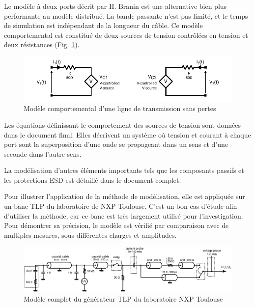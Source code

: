 Le modèle à deux ports décrit par H. Branin \cite{branin-tl-ref} est une alternative bien plus performante au modèle distribué.
La bande passante n'est pas limité, et le temps de simulation est indépendant de la longueur du câble.
Ce modèle comportemental est constitué de deux sources de tension contrôlées en tension et deux résistances (Fig. \ref{fig:beh-line-model}).

\begin{figure}[!h]
  \centering
  \includegraphics[width=\textwidth]{src/1/figures/behavioral_line_model.pdf}
  \caption{Modèle comportemental d'une ligne de transmission sans pertes}
  \label{fig:beh-line-model}
\end{figure}

Les équations définissant le comportement des sources de tension sont données dans le document final.
Elles décrivent un système où tension et courant à chaque port sont la superposition d'une onde se propageant dans un sens et d'une seconde dans l'autre sens.

La modélisation d'autres éléments importants tels que les composants passifs et les protections ESD est détaillé dans le document complet.

Pour illustrer l'application de la méthode de modélisation, elle est appliquée sur un banc TLP du laboratoire de NXP Toulouse.
C'est un bon cas d'étude afin d'utiliser la méthode, car ce banc est très largement utilisé pour l'investigation.
Pour démontrer sa précision, le modèle est vérifié par comparaison avec de multiples mesures, sous différentes charges et amplitudes.

\begin{figure}[!h]
  \centering
  \includegraphics[width=\textwidth]{src/1/figures/complete_nxp_tlp_model.pdf}
  \caption{Modèle complet du générateur TLP du laboratoire NXP Toulouse}
  \label{fig:complete-tlp-model}
\end{figure}

